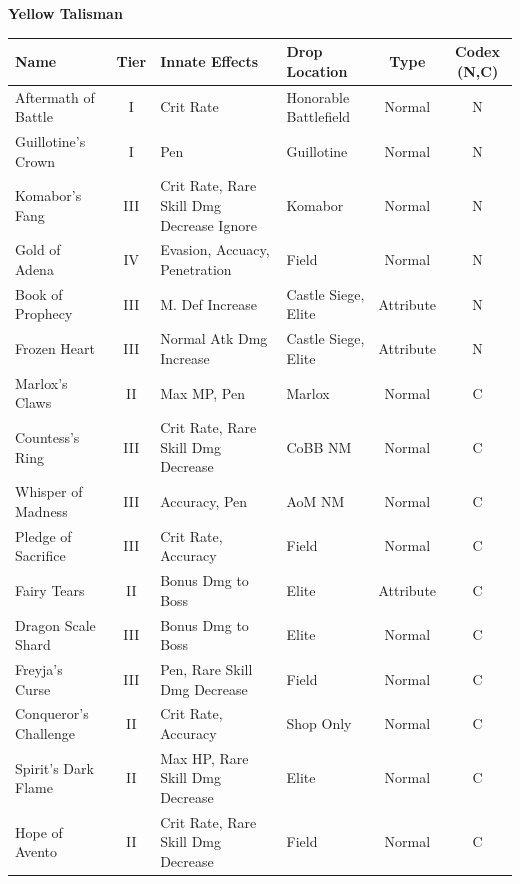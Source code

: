\documentclass[]{article}
\begin{document}
\begin{center}
\textbf{Yellow Talisman}
\begin{tabular}{|>{\centering}m{4cm}|c|>{\centering}m{4cm}|>{\centering}m{3cm}|c|c|}
	\hline 
	Name & Tier & Innate Effects & Drop Location & Type & Codex (N,C)\\ 
	\hline 
	Aftermath of Battle & I & Crit Rate & Honorable Battlefield & Normal &N\\ 
	Guillotine's Crown & I & Pen & Guillotine & Normal &N\\ 
	Komabor's Fang & III & Crit Rate, Rare Skill Dmg Decrease Ignore & Komabor & Normal &N\\ 
	Gold of Adena & IV & Evasion, Accuacy, Penetration & Field & Normal &N\\ 
	Book of Prophecy & III & M. Def Increase & Castle Siege, Elite & Attribute &N\\ 
	Frozen Heart & III & Normal Atk Dmg Increase & Castle Siege, Elite & Attribute &N \\
	
	Marlox's Claws & II & Max MP, Pen & Marlox & Normal & C\\
	
	Countess's Ring & III & Crit Rate, Rare Skill Dmg Decrease & CoBB NM & Normal & C\\
	
	Whisper of Madness & III & Accuracy, Pen & AoM NM & Normal & C\\
	
	Pledge of Sacrifice & III & Crit Rate, Accuracy & Field & Normal & C\\
	
	Fairy Tears & II & Bonus Dmg to Boss & Elite & Attribute & C\\
	
	Dragon Scale Shard & III & Bonus Dmg to Boss & Elite &Normal& C\\
	
	Freyja's Curse & III & Pen, Rare Skill Dmg Decrease & Field &Normal& C\\
	
	Conqueror's Challenge & II & Crit Rate, Accuracy & Shop Only &Normal&C\\
	
	Spirit's Dark Flame & II & Max HP, Rare Skill Dmg Decrease & Elite &Normal& C\\
	
	Hope of Avento & II & Crit Rate, Rare Skill Dmg Decrease & Field &Normal& C\\ 
	\hline 
\end{tabular} 


\end{center}
\end{document}
